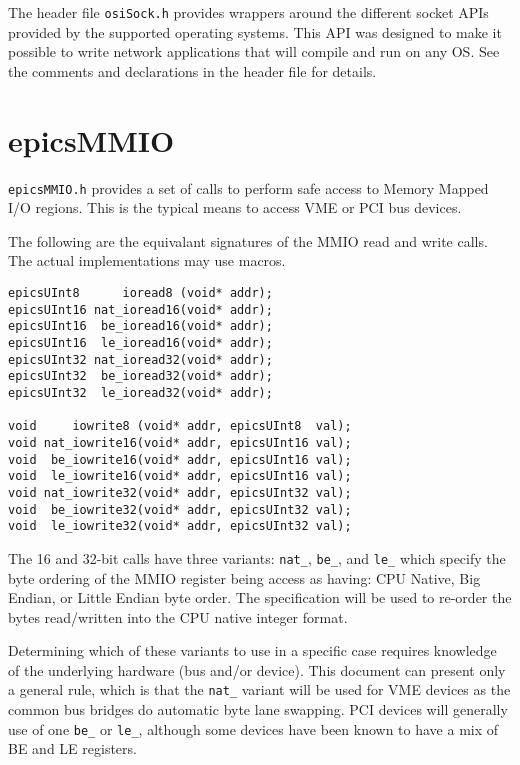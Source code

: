 The header file \verb|osiSock.h| provides wrappers around the different socket APIs provided by the supported operating systems.
This API was designed to make it possible to write network applications that will compile and run on any OS.
See the comments and declarations in the header file for details.

\section{epicsMMIO}

\verb|epicsMMIO.h| provides a set of calls to perform safe access to Memory Mapped I/O regions.
This is the typical means to access VME or PCI bus devices.

The following are the equivalant signatures of the MMIO read and write calls.
The actual implementations may use macros.

\begin{verbatim}
epicsUInt8      ioread8 (void* addr);
epicsUInt16 nat_ioread16(void* addr);
epicsUInt16  be_ioread16(void* addr);
epicsUInt16  le_ioread16(void* addr);
epicsUInt32 nat_ioread32(void* addr);
epicsUInt32  be_ioread32(void* addr);
epicsUInt32  le_ioread32(void* addr);

void     iowrite8 (void* addr, epicsUInt8  val);
void nat_iowrite16(void* addr, epicsUInt16 val);
void  be_iowrite16(void* addr, epicsUInt16 val);
void  le_iowrite16(void* addr, epicsUInt16 val);
void nat_iowrite32(void* addr, epicsUInt32 val);
void  be_iowrite32(void* addr, epicsUInt32 val);
void  le_iowrite32(void* addr, epicsUInt32 val);
\end{verbatim}

The 16 and 32-bit calls have three variants: \verb|nat_|, \verb|be_|, and \verb|le_|
which specify the byte ordering of the MMIO register being access as having:
CPU Native, Big Endian, or Little Endian byte order.
The specification will be used to re-order the bytes read/written
into the CPU native integer format.

Determining which of these variants to use in a specific case
requires knowledge of the underlying hardware (bus and/or device).
This document can present only a general rule,
which is that the \verb|nat_| variant will be used
for VME devices as the common bus bridges do automatic byte lane swapping.
PCI devices will generally use of one \verb|be_| or \verb|le_|, although
some devices have been known to have a mix of BE and LE registers.


